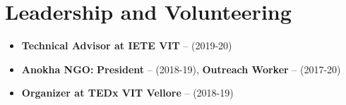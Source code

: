 \section{Leadership and Volunteering}

\vspace{1pt}

\begin{itemize}

\item \textbf{Technical Advisor at IETE VIT} -- (2019-20)
\item \textbf{Anokha NGO: } \textbf{President} -- (2018-19), \textbf{Outreach Worker} -- (2017-20)
\item \textbf{Organizer at TEDx VIT Vellore} -- (2018-19)

\end{itemize}
